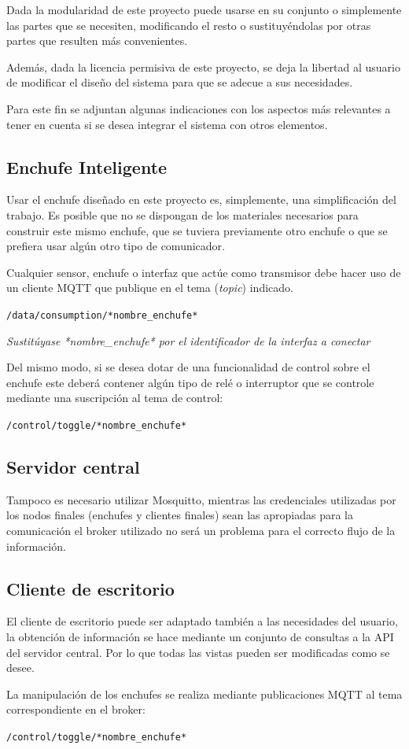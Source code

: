 \documentclass[a4paper,10pt]{article}
\begin{document}
Dada la modularidad de este proyecto puede usarse en su
conjunto o simplemente las partes que se necesiten, modificando el
resto o sustituyéndolas por otras partes que resulten más
convenientes.

Además, dada la licencia permisiva de este proyecto, se deja la
libertad al usuario de modificar el diseño del sistema para que se
adecue a sus necesidades.

Para este fin se adjuntan algunas indicaciones con los aspectos más
relevantes a tener en cuenta si se desea integrar el sistema con otros
elementos.

\subsection{Enchufe Inteligente}

Usar el enchufe diseñado en este proyecto es, simplemente, una
simplificación del trabajo. Es posible que no se dispongan de los
materiales necesarios para construir este mismo enchufe, que se
tuviera previamente otro enchufe o que se prefiera usar algún otro
tipo de comunicador.

Cualquier sensor, enchufe o interfaz que actúe como transmisor debe
hacer uso de un cliente MQTT que publique en el tema (\textit{topic})
indicado.

\texttt{/data/consumption/*nombre\_enchufe*}

\textit{Sustitúyase *nombre\_enchufe* por el identificador de la
  interfaz a conectar}

Del mismo modo, si se desea dotar de una funcionalidad de control
sobre el enchufe este deberá contener algún tipo de relé o interruptor
que se controle mediante una suscripción al tema de control:

\texttt{/control/toggle/*nombre\_enchufe*}

\subsection{Servidor central}

Tampoco es necesario utilizar Mosquitto, mientras las credenciales
utilizadas por los nodos finales (enchufes y clientes finales) sean
las apropiadas para la comunicación el broker utilizado no será un
problema para el correcto flujo de la información.

\subsection{Cliente de escritorio}

El cliente de escritorio puede ser adaptado también a las necesidades
del usuario, la obtención de información se hace mediante un conjunto
de consultas a la API del servidor central. Por lo que todas las
vistas pueden ser modificadas como se desee.

La manipulación de los enchufes se realiza mediante publicaciones MQTT
al tema correspondiente en el broker:

\texttt{/control/toggle/*nombre\_enchufe*}

\newpage


\begingroup
\raggedright%

 
\endgroup
\end{document}
